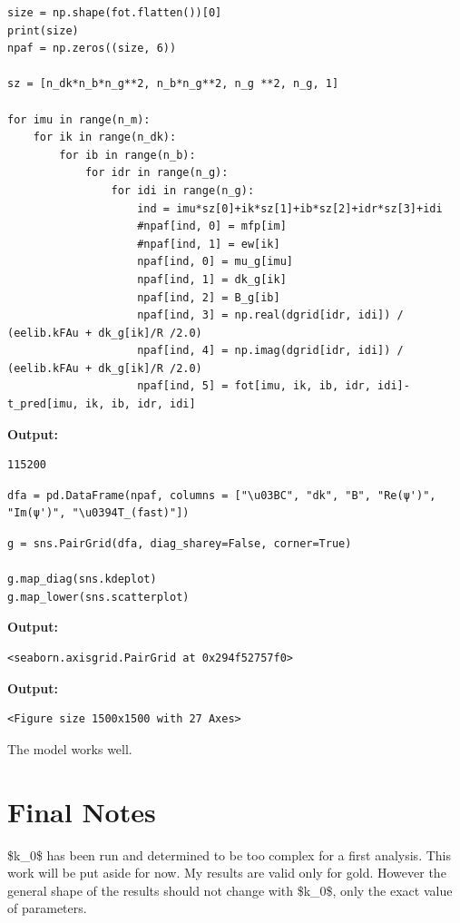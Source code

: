\documentclass{article}
\begin{document}
\begin{lstlisting}
size = np.shape(fot.flatten())[0]
print(size)
npaf = np.zeros((size, 6))

sz = [n_dk*n_b*n_g**2, n_b*n_g**2, n_g **2, n_g, 1]

for imu in range(n_m):
    for ik in range(n_dk):
        for ib in range(n_b):
            for idr in range(n_g):
                for idi in range(n_g):
                    ind = imu*sz[0]+ik*sz[1]+ib*sz[2]+idr*sz[3]+idi
                    #npaf[ind, 0] = mfp[im]
                    #npaf[ind, 1] = ew[ik]
                    npaf[ind, 0] = mu_g[imu]
                    npaf[ind, 1] = dk_g[ik]
                    npaf[ind, 2] = B_g[ib]
                    npaf[ind, 3] = np.real(dgrid[idr, idi]) / (eelib.kFAu + dk_g[ik]/R /2.0)
                    npaf[ind, 4] = np.imag(dgrid[idr, idi]) / (eelib.kFAu + dk_g[ik]/R /2.0)
                    npaf[ind, 5] = fot[imu, ik, ib, idr, idi]-t_pred[imu, ik, ib, idr, idi]\end{lstlisting}

\textbf{Output:}\begin{verbatim}
115200

\end{verbatim}

\begin{lstlisting}
dfa = pd.DataFrame(npaf, columns = ["\u03BC", "dk", "B", "Re(ψ')", "Im(ψ')", "\u0394T_(fast)"])\end{lstlisting}

\begin{lstlisting}
g = sns.PairGrid(dfa, diag_sharey=False, corner=True)

g.map_diag(sns.kdeplot)
g.map_lower(sns.scatterplot)\end{lstlisting}

\textbf{Output:}\begin{verbatim}
<seaborn.axisgrid.PairGrid at 0x294f52757f0>
\end{verbatim}

\textbf{Output:}\begin{verbatim}
<Figure size 1500x1500 with 27 Axes>
\end{verbatim}

The model works well.

\section{Final Notes}

\$k\_0\$ has been run and determined to be too complex for a first analysis. This work will be put aside for now. My results are valid only for gold. However the general shape of the results should not change with \$k\_0\$, only the exact value of parameters.
\end{document}
